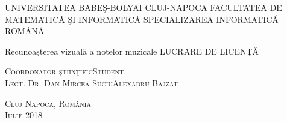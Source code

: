 \begin{titlepage}
	\begin{center}
		\vspace{0.5cm}
		\Large \textsc{UNIVERSITATEA BABEŞ-BOLYAI CLUJ-NAPOCA FACULTATEA DE MATEMATICǍ ŞI INFORMATICǍ 
		SPECIALIZAREA INFORMATICĂ ROMÂNĂ }

		\vfill

		\Huge Recunoaşterea vizuală a notelor muzicale
		\Large LUCRARE DE LICENŢĂ

		\vfill

		\Large
		\textsc{Coordonator ştiinţific}\hfill \textsc{Student}
		\\
		\large
		\textsc{Lect. Dr. Dan Mircea Suciu}\hfill \textsc{Alexadru Bajzat}
	
		\vspace{1.5cm}
		\textsc{Cluj Napoca, România}\\
		\textsc{Iulie 2018}

	\end{center}
\end{titlepage}
 
